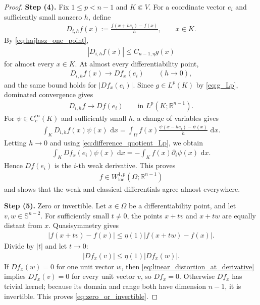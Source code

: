 \documentclass[11pt]{amsart}
\theoremstyle{plain}
\theoremstyle{plain}
\theoremstyle{plain}
\newcommand{\dd}{\,\mathrm{d}}
\newcommand{\R}{\mathbb R}
\numberwithin{equation}{section}
\begin{document}
\begin{proof}
\textbf{Step (4).} Fix \(1\leq p<n-1\) and \(K\Subset V\).  For a coordinate vector \(e_i\)
and sufficiently small nonzero \(h\), define
\begin{align}
D_{i,h}f(x)
:=
\frac{f(x+he_i)-f(x)}{h},
\qquad x\in K.\nonumber
\end{align}
By \eqref{eq:hajlasz_one_point},
\begin{align}
|D_{i,h}f(x)|\leq C_{n-1,\eta}g(x)\nonumber
\end{align}
for almost every \(x\in K\).  At almost every differentiability point,
\begin{align}
D_{i,h}f(x)\longrightarrow Df_x(e_i)
\qquad(h\to0),\nonumber
\end{align}
and the same bound holds for \(|Df_x(e_i)|\).  Since \(g\in L^p(K)\) by \eqref{eq:g_Lp},
dominated convergence gives
\begin{align}
D_{i,h}f
\longrightarrow
Df(e_i)
\qquad
\text{in }L^p(K;\R^{n-1}).
\label{eq:difference_quotient_Lp}
\end{align}
For \(\psi\in C_c^\infty(K)\) and sufficiently small \(h\), a change of
variables gives
\begin{align}
\int_KD_{i,h}f(x)\psi(x)\,\dd x
=
\int_\Omega
f(x)
\frac{\psi(x-he_i)-\psi(x)}{h}
\,\dd x.\nonumber
\end{align}
Letting \(h\to0\) and using \eqref{eq:difference_quotient_Lp}, we obtain
\begin{align}
\int_KDf_x(e_i)\psi(x)\,\dd x
=
-\int_Kf(x)\partial_i\psi(x)\,\dd x.\nonumber
\end{align}
Hence \(Df(e_i)\) is the \(i\)-th weak derivative.  This proves
\begin{align}
f\in W^{1,p}_{\mathrm{loc}}(\Omega;\R^{n-1})\nonumber
\end{align}
and shows that the weak and classical differentials agree almost
everywhere.

\textbf{Step (5).} Zero or invertible.
Let \(x\in\Omega\) be a differentiability point, and let
\(v,w\in\mathbb S^{n-2}\).  For sufficiently small \(t\neq0\), the points
\(x+tv\) and \(x+tw\) are equally distant from \(x\).  Quasisymmetry gives
\begin{align}
|f(x+tv)-f(x)|
\leq
\eta(1)|f(x+tw)-f(x)|.\nonumber
\end{align}
Divide by \(|t|\) and let \(t\to0\):
\begin{align}
|Df_x(v)|
\leq
\eta(1)|Df_x(w)|.
\label{eq:linear_distortion_at_derivative}
\end{align}
If \(Df_x(w)=0\) for one unit vector \(w\), then
\eqref{eq:linear_distortion_at_derivative} implies \(Df_x(v)=0\) for every
unit vector \(v\), so \(Df_x=0\).  Otherwise \(Df_x\) has trivial kernel;
because its domain and range both have dimension \(n-1\), it is invertible.
This proves \eqref{eq:zero_or_invertible}.
\end{proof}
\end{document}
